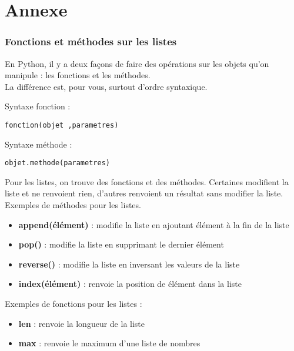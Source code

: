 \newpage

\section*{Annexe}


\subsubsection*{Fonctions et méthodes sur les listes}

\noindent En Python, il y a deux fa\c cons de faire des opérations sur les objets qu'on manipule : les fonctions et les méthodes.\\
La différence est, pour vous, surtout d'ordre syntaxique.\\
\begin{center}
\begin{minipage}{7cm}
Syntaxe fonction :
\begin{verbatim}
fonction(objet ,parametres)
\end{verbatim}
\end{minipage}
\begin{minipage}{7cm}
Syntaxe méthode :
\begin{verbatim}
objet.methode(parametres)
\end{verbatim}
\end{minipage}
\bigskip 
\end{center}
Pour les listes, on trouve des fonctions et des méthodes. Certaines modifient la liste et ne renvoient rien, d'autres renvoient un résultat sans modifier la liste.\bigskip \\
Exemples de méthodes pour les listes. 
\begin{itemize}
\item \textbf{append(élément)} : modifie la liste en ajoutant élément \` a la fin de la liste
\item \textbf{pop()} : modifie la liste en supprimant le dernier élément
\item \textbf{reverse()} : modifie la liste en inversant les valeurs de la liste
\item \textbf{index(élément)} : renvoie la position de élément dans la liste
\bigskip 
\end{itemize}
Exemples de fonctions pour les listes :
\begin{itemize}
\item \textbf{len} : renvoie la longueur de la liste
\item \textbf{max} : renvoie le maximum d'une liste de nombres
\end{itemize}


